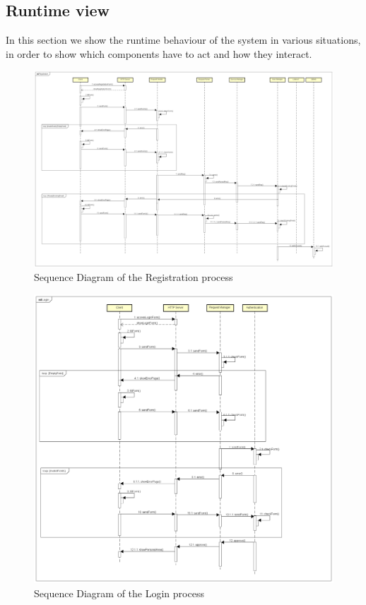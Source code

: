 \newpage

\subsection{Runtime view}
In this section we show the runtime behaviour of the system in various situations, in order to show which components have to act and how they interact.
\begin{figure}[H]	
	\centering
	\includegraphics[width=\textwidth]{img/sequence_registration}
	\caption{Sequence Diagram of the Registration process}
\end{figure}
\newpage

\begin{figure}[H]	
	\centering
	\includegraphics[width=\textwidth]{img/sequence_login}
	\caption{Sequence Diagram of the Login process}
\end{figure}
\newpage


